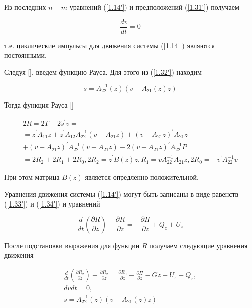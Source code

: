 Из последних $n - m$ уравнений (\ref{1.14'}) и предположений (\ref{1.31'}) получаем 

\begin{equation} \label{1.33'}
\frac{d v}{d t} = 0
\end{equation}

т.е. циклические импульсы для движения системы (\ref{1.14'}) являются постоянными.

Следуя [], введем функцию Рауса. Для этого из (\ref{1.32'}) находим

\begin{equation} \label{1.34'}
\dot s = A_{22}^{-1} (z) (v - A_{21} (z) \dot z)
\end{equation}

Тогда функция Рауса [] 

\begin{equation} \label{1.35'}
\begin{array}{c}
	2R = 2T - 2 \dot s^{'} v =\\
	= \dot z^{'} A_{11} \dot z + \dot z^{'} A_{12} A_{22}^{-1} (v - A_{21} \dot z) + (v - A_{21} \dot z)^{'} A_{21} \dot z +\\
	+ (v - A_21 \dot z)^{'} A_{22}^{-1} (v - A_{21} \dot z) - 2 (v - A_{21} \dot z)^{'} A_{22}^{-1} P =\\
	= 2 R_2 + 2 R_1 + 2 R_0, 2 R_2 = \dot z^{'} B (z) \dot z, R_1 = v A_{22}^{-1} A_{21} \dot z, 2 R_0 = - v^{'} A_{22}^{-1} v
\end{array}
\end{equation}

При этом матрица $B(z)$ является опредленно-положительной.

Уравнения движения системы (\ref{1.14'}) могут быть записаны в виде равенств (\ref{1.33'}) и (\ref{1.34'}) и уравнений

\begin{equation} \label{1.36'}
\frac{d}{dt} (\frac{\partial R}{\partial \dot z}) - \frac{\partial R}{\partial z} = - \frac{\partial \Pi}{\partial z} + Q_z + U_z
\end{equation}

После подстановки выражения для функции $R$ получаем следующие уравнения движения 

\begin{equation} \label{1.37'}
\begin{array}{c}
\displaystyle \frac{d}{dt} (\frac{\partial R_2}{\partial \dot z}) - \frac{\partial R_2}{\partial z} = \frac{\partial R_0}{\partial z} - \frac{\partial \Pi}{\partial z} - G \dot z + U_z + Q_z,\\
{d v}{d t} = 0,\\
\displaystyle \dot s = A_{22}^{-1} (z) (v - A_{21} (z) \dot z)
\end{array}
\end{equation}

